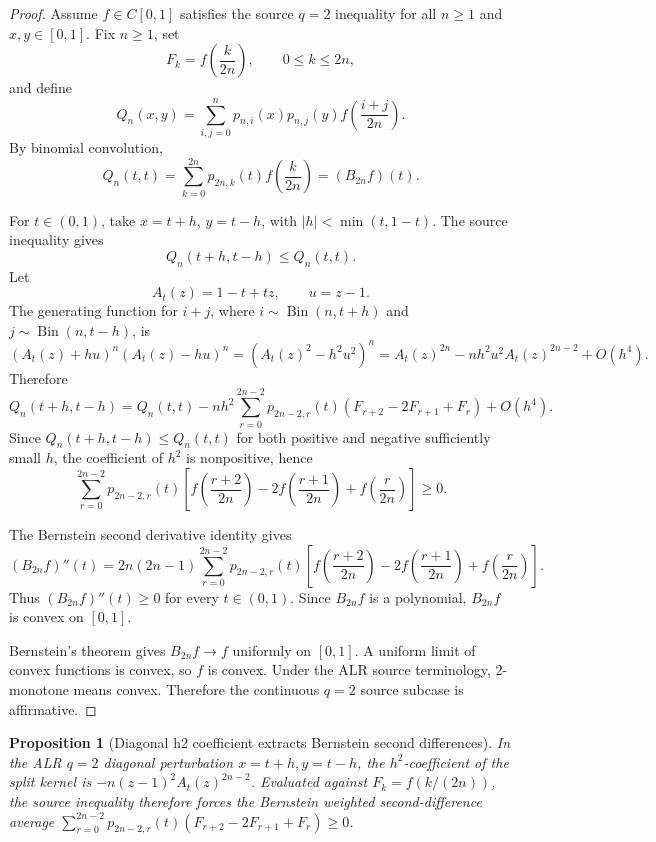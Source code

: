\documentclass[11pt]{article}
\numberwithin{equation}{section}
\newtheorem{proposition}[theorem]{Proposition}
\theoremstyle{definition}
\theoremstyle{remark}
\newcommand{\1}{\mathbf 1}
\begin{document}
\begin{proof}
Assume \(f\in C[0,1]\) satisfies the source \(q=2\) inequality for all \(n\ge1\) and \(x,y\in[0,1]\). Fix \(n\ge1\), set
\[
F_k=f\left(\frac{k}{2n}\right),\qquad 0\le k\le2n,
\]
and define
\[
Q_n(x,y)=\sum_{i,j=0}^{n}p_{n,i}(x)p_{n,j}(y)
f\left(\frac{i+j}{2n}\right).
\]
By binomial convolution,
\[
Q_n(t,t)=\sum_{k=0}^{2n}p_{2n,k}(t)f\left(\frac{k}{2n}\right)
=(B_{2n}f)(t).
\]

For \(t\in(0,1)\), take \(x=t+h\), \(y=t-h\), with \(|h|<\min(t,1-t)\). The source inequality gives
\[
Q_n(t+h,t-h)\le Q_n(t,t).
\]
Let
\[
A_t(z)=1-t+tz,\qquad u=z-1.
\]
The generating function for \(i+j\), where \(i\sim\operatorname{Bin}(n,t+h)\) and \(j\sim\operatorname{Bin}(n,t-h)\), is
\[
(A_t(z)+hu)^n(A_t(z)-hu)^n
=\left(A_t(z)^2-h^2u^2\right)^n
=A_t(z)^{2n}-nh^2u^2A_t(z)^{2n-2}+O(h^4).
\]
Therefore
\[
Q_n(t+h,t-h)
=Q_n(t,t)
-nh^2\sum_{r=0}^{2n-2}p_{2n-2,r}(t)
\left(F_{r+2}-2F_{r+1}+F_r\right)
+O(h^4).
\]
Since \(Q_n(t+h,t-h)\le Q_n(t,t)\) for both positive and negative sufficiently small \(h\), the coefficient of \(h^2\) is nonpositive, hence
\[
\sum_{r=0}^{2n-2}p_{2n-2,r}(t)
\left[
f\left(\frac{r+2}{2n}\right)
-2f\left(\frac{r+1}{2n}\right)
+f\left(\frac{r}{2n}\right)
\right]\ge0.
\]

The Bernstein second derivative identity gives
\[
(B_{2n}f)''(t)=2n(2n-1)
\sum_{r=0}^{2n-2}p_{2n-2,r}(t)
\left[
f\left(\frac{r+2}{2n}\right)
-2f\left(\frac{r+1}{2n}\right)
+f\left(\frac{r}{2n}\right)
\right].
\]
Thus \((B_{2n}f)''(t)\ge0\) for every \(t\in(0,1)\). Since \(B_{2n}f\) is a polynomial, \(B_{2n}f\) is convex on \([0,1]\).

Bernstein's theorem gives \(B_{2n}f\to f\) uniformly on \([0,1]\). A uniform limit of convex functions is convex, so \(f\) is convex. Under the ALR source terminology, \(2\)-monotone means convex. Therefore the continuous \(q=2\) source subcase is affirmative.
\end{proof}

\begin{proposition}[Diagonal h2 coefficient extracts Bernstein second differences]
\label{res:diagonal-h2-coefficient-extracts-second-difference}
In the ALR \(q=2\) diagonal perturbation \(x=t+h,y=t-h\), the \(h^2\)-coefficient of the split kernel is \(-n(z-1)^2A_t(z)^{2n-2}\). Evaluated against \(F_k=f(k/(2n))\), the source inequality therefore forces the Bernstein weighted second-difference average \(\sum_{r=0}^{2n-2}p_{2n-2,r}(t)(F_{r+2}-2F_{r+1}+F_r)\ge0\).
\end{proposition}
\end{document}
